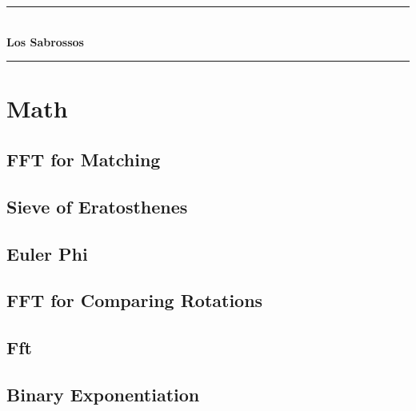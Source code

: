 \documentclass[10pt]{article}
\begin{document}
\begin{titlepage}
    \pagecolor{ivory}
    \color{graphite}
    \centering
    \vspace*{0.35\textheight}

    {\color{navyaccent}\rule{0.32\textwidth}{0.6pt}}\\[1.8em]

    {\fontsize{36}{40}\selectfont\bfseries\color{navy} Los Sabrossos}\\[1.8em]

    {\color{navyaccent}\rule{0.32\textwidth}{0.6pt}}

\end{titlepage}
\pagecolor{white}\newpage{}\tableofcontents\newpage{}

\section{Math}
\subsection{\texorpdfstring{{FFT for Matching}}{{FFT for Matching}}}

\subsection{\texorpdfstring{{Sieve of Eratosthenes}}{{Sieve of Eratosthenes}}}

\subsection{\texorpdfstring{{Euler Phi}}{{Euler Phi}}}

\subsection{\texorpdfstring{{FFT for Comparing Rotations}}{{FFT for Comparing Rotations}}}

\subsection{\texorpdfstring{{Fft}}{{Fft}}}

\subsection{\texorpdfstring{{Binary Exponentiation}}{{Binary Exponentiation}}}

\end{document}
